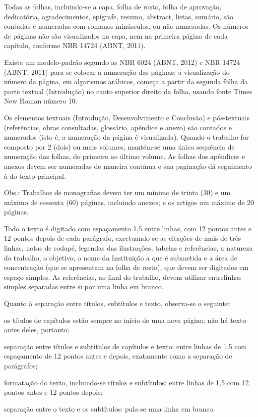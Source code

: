 \documentclass[a4paper,12pt]{article}  %
\begin{document}
\begin{ElementosTextuais}
\begin{Desenvolvimento}
Todas as folhas, incluindo-se a capa, folha de rosto, folha de aprovação, dedicatória, agradecimentos, epígrafe, resumo, abstract, listas, sumário, são contadas e numeradas com romanos minúsculos, ou não numeradas. Os números de páginas não são visualizados na capa, nem na primeira página de cada capítulo, conforme NBR 14724 (ABNT, 2011).

Existe um modelo-padrão segundo as NBR 6024 (ABNT, 2012) e NBR 14724 (ABNT, 2011) para se colocar a numeração das páginas: a visualização do número da página, em algarismos arábicos, começa a partir da segunda folha da parte textual (Introdução) no canto superior direito da folha, usando fonte Times New Roman número 10.

Os elementos textuais (Introdução, Desenvolvimento e Conclusão) e pós-textuais (referências, obras consultadas, glossário, apêndice e anexo) são contados e numerados (isto é, a numeração da página é visualizada). Quando o trabalho for composto por 2 (dois) ou mais volumes, mantém-se uma única sequência de numeração das folhas, do primeiro ao último volume. As folhas dos apêndices e anexos devem ser numeradas de maneira contínua e sua paginação dá seguimento à do texto principal.

Obs.: Trabalhos de monografias devem ter um mínimo de trinta (30) e um máximo de sessenta (60) páginas, incluindo anexos; e os artigos um máximo de 20 páginas.

Todo o texto é digitado com espaçamento 1,5 entre linhas, com 12 pontos antes e 12 pontos depois de cada parágrafo, excetuando-se as citações de mais de três linhas, notas de rodapé, legendas das ilustrações, tabelas e referências, a natureza do trabalho, o objetivo, o nome da Instituição a que é submetida e a área de concentração (que se apresentam na folha de rosto), que devem ser digitados em espaço simples. As referências, ao final do trabalho, devem utilizar entrelinhas simples separadas entre si por uma linha em branco.

Quanto à separação entre títulos, subtítulos e texto, observa-se o seguinte:

\begin{alphaitemize}
  \item os títulos de capítulos estão sempre no início de uma nova página; não há texto antes deles, portanto;
  \item separação entre títulos e subtítulos de capítulos e texto: entre linhas de 1,5 com espaçamento de 12 pontos antes e depois, exatamente como a separação de parágrafos;
  \item formatação do texto, incluindo-se títulos e subtítulos: entre linhas de 1,5 com 12 pontos antes e 12 pontos depois;
  \item separação entre o texto e os subtítulos: pula-se uma linha em branco.
\end{alphaitemize}


\end{Desenvolvimento}
\end{ElementosTextuais}
\end{document}
